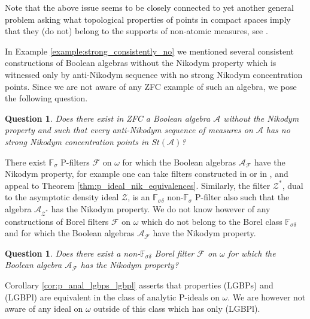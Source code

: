 \documentclass[a4paper,11pt,fleqn]{amsart}
\newtheorem{question}[theorem]{Question}
\theoremstyle{definition}
\theoremstyle{remark}
\numberwithin{equation}{section}
\newcommand{\F}{\mathbb{F}}
\newcommand{\aA}{\mathcal{A}}
\newcommand{\fF}{\mathcal{F}}
\newcommand{\zZ}{\mathcal{Z}}
\begin{document}
Note that the above issue seems to be closely connected to yet another general problem asking what topological properties of points in compact spaces imply that they (do not) belong to the supports of non-atomic measures, see \cite{BNR23}.

In Example \ref{example:strong_consistently_no} we mentioned several consistent constructions of Boolean algebras without the Nikodym property which is witnessed only by anti-Nikodym sequence with no strong Nikodym concentration points. Since we are not aware of any \textsf{ZFC} example of such an algebra, we pose the following question.

\begin{question}\label{ques:no_strong_cp}
    Does there exist in \textup{\textsf{ZFC}} a Boolean algebra $\aA$ without the Nikodym property and such that every anti-Nikodym sequence of measures on $\aA$ has no strong Nikodym concentration points in $St(\aA)$?
\end{question}

There exist $\F_{\sigma}$ P-filters $\fF$ on $\omega$ for which the Boolean algebras $\aA_\fF$ have the Nikodym property, for example one can take filters constructed in \cite[Theorem 4.12]{FT19} or in \cite[Example 6.15]{MS24}, and appeal to Theorem \ref{thm:p_ideal_nik_equivalences}. %
Similarly, the filter $\zZ^*$, dual to the asymptotic density ideal $\zZ$, is an $\F_{\sigma\delta}$ non-$\F_\sigma$ P-filter also such that the algebra $\aA_{\zZ^*}$ has the Nikodym property. We do not know however of any constructions of Borel filters $\fF$ on $\omega$ which do not belong to the Borel class $\F_{\sigma\delta}$ and for which the Boolean algebras $\aA_\fF$ have the Nikodym property.

\begin{question}
    Does there exist a non-$\F_{\sigma\delta}$ Borel filter $\fF$ on $\omega$ for which the Boolean algebra $\aA_\fF$ has the Nikodym property?%
\end{question}

Corollary \ref{cor:p_anal_lgbps_lgbpl} asserts that properties (LGBPs) and (LGBPl) are equivalent in the class of analytic P-ideals on $\omega$. We are however not aware of any ideal on $\omega$ outside of this class which has only (LGBPl).
\end{document}
